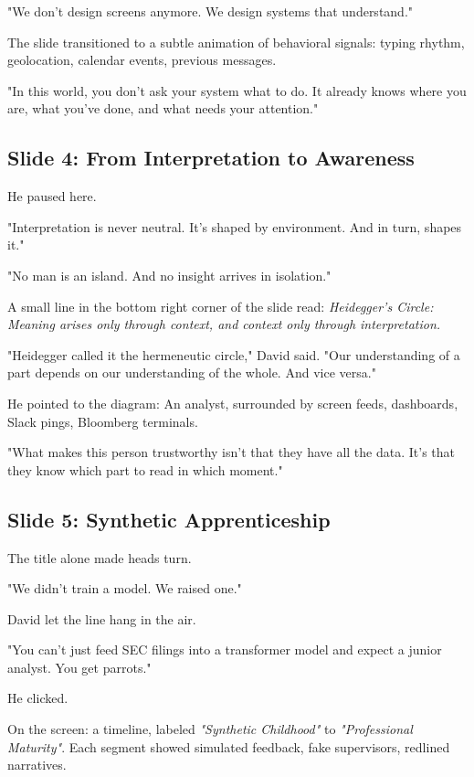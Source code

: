 "We don’t design screens anymore. We design systems that understand."

The slide transitioned to a subtle animation of behavioral signals: typing rhythm, geolocation, 
calendar events, previous messages.

"In this world, you don’t ask your system what to do. It already knows where you are, what 
you’ve done, and what needs your attention."

\subsection{Slide 4: From Interpretation to Awareness}

He paused here.

"Interpretation is never neutral. It’s shaped by environment. And in turn, shapes it."

"No man is an island. And no insight arrives in isolation."

A small line in the bottom right corner of the slide read:
\textit{Heidegger's Circle: Meaning arises only through context, and context only through interpretation.}

"Heidegger called it the hermeneutic circle," David said. "Our understanding of a part depends on our 
understanding of the whole. And vice versa."

He pointed to the diagram:
An analyst, surrounded by screen feeds, dashboards, Slack pings, Bloomberg terminals.

"What makes this person trustworthy isn’t that they have all the data. It’s that they know which part 
to read in which moment."

\subsection{Slide 5: Synthetic Apprenticeship}

The title alone made heads turn.

"We didn’t train a model. We raised one."

David let the line hang in the air.

"You can’t just feed SEC filings into a transformer model and expect a junior analyst. You get parrots."

He clicked.

On the screen: a timeline, labeled \textit{"Synthetic Childhood"} to \textit{"Professional Maturity"}. 
Each segment showed simulated feedback, fake supervisors, redlined narratives.

